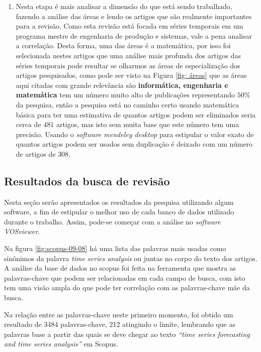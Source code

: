 \begin{enumerate}[start=1, label = {\textbf{Etapa} \arabic* } ]
\item  \label{etp:rev-4}Nesta etapa é mais analisar a dimensão do que está sendo trabalhado, fazendo a análise das áreas e lendo os artigos que são realmente importantes para a revisão. Como esta revisão está focada em séries temporais em um programa mestre de engenharia de produção e sistemas, vale a pena analisar a correlação. Desta forma, uma das áreas é a matemática, por isso foi selecionada nestes artigos que uma análise mais profunda dos artigos das séries temporais pode resultar se olharmos as áreas de especialização dos artigos pesquisados, como pode ser visto na Figura \ref{fig: áreas} que as áreas aqui citadas com grande relevância são \textbf{informática, engenharia e matemática} tem um número muito alto de publicações representando $50\%$ da pesquisa, então a pesquisa está no caminho certo usando matemática básica para ter uma estimativa de quantos artigos podem ser eliminados seria cerca de $481$ artigos, mas isto sem muita base que este número tem uma precisão. Usando o \textit{software mendeley desktop} para estipular o valor exato de quantos artigos podem ser usados sem duplicação é deixado com um número de artigos de $308$.
\end{enumerate}

\subsection{Resultados da busca de revis\~ao}\label{subesec:resul da revisão}


Nesta seção serão apresentados os resultados da pesquisa utilizando algum software, a fim de estipular o melhor uso de cada banco de dados utilizado durante o trabalho. Assim, pode-se começar com a análise no \textit{software VOSviewer}. 


Na figura \ref{fig:scopus-09-08} há uma lista das palavras mais usadas como sinônimos da palavra \textit{time series analysis} ou juntas no corpo do texto dos artigos.
A análise da base de dados no scopus foi feita na ferramenta que mostra as palavras-chave que podem ser relacionadas em cada campo de busca, com isto tem uma visão ampla do que pode ter correlação com as palavras-chave mãe da busca.

Na relação entre as palavras-chave neste primeiro momento, foi obtido um resultado de 3484 palavras-chave, 212 atingindo o limite, lembrando que as palavras base a partir das quais se deve chegar ao texto \textit{``time series forecasting and time series analysis''} em Scopus.




